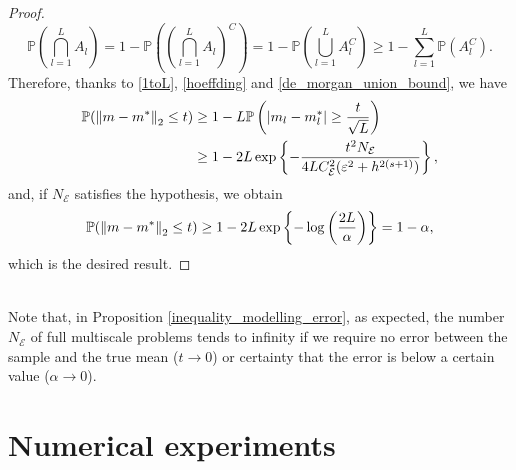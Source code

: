 \documentclass[10pt]{article}
\begin{document}
\begin{proof}
\begin{equation}
\label{de_morgan_union_bound}
\mathbb{P}\left ( \bigcap_{l=1}^L A_l \right ) = 1 - \mathbb{P} \left ( \left ( \bigcap_{l=1}^L A_l \right )^C \right ) = 1 - \mathbb{P} \left ( \bigcup_{l=1}^L A_l^C \right ) \ge 1 - \sum_{l=1}^L \mathbb{P}(A_l^C).
\end{equation}
Therefore, thanks to \eqref{1toL}, \eqref{hoeffding} and \eqref{de_morgan_union_bound}, we have
\begin{align*}
\mathbb{P}( \left\|m - m^*\right\|_2 \le t ) \ge & \; 1 - L \mathbb{P} \left ( \left\lvert m_l - m^*_l\right\rvert \ge \frac{t}{\sqrt{L}} \right ) \\
\ge & \; 1 - 2L \exp \left \{ - \frac{t^2 N_{\mathcal{E}}}{4 L C_{\mathcal{E}}^2 (\varepsilon^2 + h^{2(s+1)})} \right \},
\end{align*}
and, if $N_{\mathcal{E}}$ satisfies the hypothesis, we obtain
\begin{equation*}
\mathbb{P}( \left\|m - m^*\right\|_2 \le t ) \ge 1 - 2L \exp \left \{ - \log \left ( \frac{2L}{\alpha} \right ) \right \} = 1 - \alpha,
\end{equation*}
which is the desired result.
\end{proof}

\begin{remark}
\leavevmode \\
Note that, in Proposition \ref{inequality_modelling_error}, as expected, the number $N_{\mathcal{E}}$ of full multiscale problems tends to infinity if we require no error between the sample and the true mean ($t \to 0$) or certainty that the error is below a certain value ($\alpha \to 0$).
\end{remark}

\section{Numerical experiments}
\end{document}
